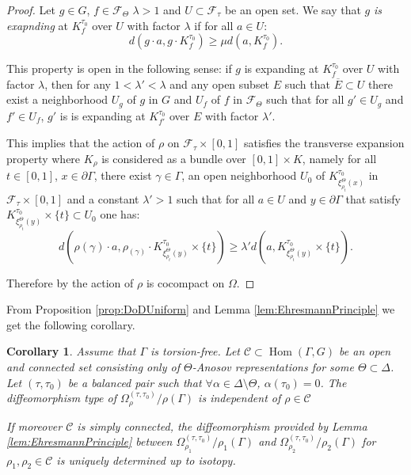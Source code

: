 \documentclass[reqno,10pt]{amsart}
\theoremstyle{plain}
\newtheorem{cor}[thm]{Corollary}
\theoremstyle{definition}
\theoremstyle{remark}
\newcommand{\type}{\tau}
\newcommand{\typeS}{{\tau_0}}
\DeclareMathOperator{\Hom}{Hom}
\newcommand{\ie}{namely }
\begin{document}
\begin{proof}
\medskip

 Let $g\in G$, $f\in \mathcal{F}_\Theta$ $\lambda >1$ and $U\subset \mathcal{F}_\type$ be an open set. We say that $g$ \emph{is exapnding} at $K_f^\typeS$ over $U$ with factor $\lambda$ if for all $a\in U$:
$$d\left(g\cdot a, g\cdot K^\typeS_f\right)\geq \mu d\left(a,K^\typeS_f\right).$$

This property is open in the following sense: if $g$ is expanding at $K_f^\typeS$ over $U$ with factor $\lambda$, then for any $1<\lambda'<\lambda$ and any open subset $E$ such that $\overline{E}\subset U$ there exist a neighborhood $U_g$ of $g$ in $G$ and $U_f$ of $f$ in $\mathcal{F}_\Theta$ such that for all $g'\in U_g$ and $f'\in U_f$, $g'$ is is expanding at $K_{f'}^\typeS$ over $E$ with factor $\lambda'$.

\medskip

 This implies that the action of $\rho$ on $\mathcal{F}_\type\times [0,1]$ satisfies the transverse expansion property where $K_\rho$ is considered as a bundle over $[0,1]\times K$, \ie for all $t\in [0,1]$, $x\in \partial \Gamma$, there exist $\gamma\in \Gamma$, an open neighborhood $U_0$ of $K^{\typeS}_{\xi_{\rho_t}^\Theta(x)}$ in $\mathcal{F}_\type\times [0,1]$ and a constant $\lambda'>1$ such that for all $a\in U$ and $y\in \partial \Gamma$ that satisfy $K^{\typeS}_{\xi_{\rho_t}^\Theta(y)}\times \lbrace t\rbrace \subset U_0$ one has:
$$d\left(\rho(\gamma)\cdot a,\rho_(\gamma)\cdot K^{\typeS}_{\xi_{\rho_t}^\Theta(y)}\times \lbrace t\rbrace \right) \geq \lambda' d\left(a,K^{\typeS}_{\xi_{\rho_t}^\Theta(y)}\times \lbrace t\rbrace\right).$$
 
 Therefore by \cite[Proposition 5.26]{KLP-DoD} the action of $\rho$ is cocompact on $\Omega$.
\end{proof}

From Proposition \ref{prop:DoDUniform} and Lemma \ref{lem:EhresmannPrinciple} we get the following corollary.

\begin{cor}
\label{cor:EhresmanApplied}
Assume that $\Gamma$ is torsion-free. Let $\mathcal{C}\subset \Hom(\Gamma,G)$ be an open and connected set consisting only of $\Theta$-Anosov representations for some $\Theta\subset \Delta$. Let $(\type,\typeS)$ be a balanced pair such that $\forall \alpha\in \Delta\setminus \Theta$, $ \alpha(\typeS)=0$. The diffeomorphism type of $\Omega_{\rho}^{(\type,\typeS)}/\rho(\Gamma)$ is independent of $\rho\in \mathcal{C}$

\medskip

If moreover $\mathcal{C}$ is simply connected, the diffeomorphism provided by Lemma \ref{lem:EhresmannPrinciple} between $\Omega_{\rho_1}^{(\type,\typeS)}/\rho_1(\Gamma)$ and $\Omega_{\rho_2}^{(\type,\typeS)}/\rho_2(\Gamma)$ for $\rho_1,\rho_2\in \mathcal{C}$ is uniquely determined up to isotopy.
\end{cor}
\end{document}
